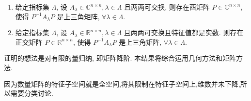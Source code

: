 \documentclass[../../main.tex]{subfiles}%
\begin{document}
\begin{proposition}\label{proposition:一族两两可交换的复数(实数)域上的矩阵可同时酉(正交)上三角化}
\begin{enumerate}
\item 给定指标集 $\Lambda$, 设 $A_{\lambda} \in \mathbb{C}^{n \times n}, \lambda \in \Lambda$ 且两两可交换, 则存在酉矩阵 $P \in \mathbb{C}^{n \times n}$, 使得
\(
P^{-1}A_{\lambda}P
\)
是上三角矩阵, $\forall \lambda \in \Lambda$.

\item 给定指标集 $\Lambda$, 设 $A_{\lambda} \in \mathbb{R}^{n \times n}, \lambda \in \Lambda$ 且两两可交换且特征值都是实数. 则存在正交矩阵 $P \in \mathbb{R}^{n \times n}$, 使得
\(
P^{-1}A_{\lambda}P
\)
是上三角矩阵, $\forall \lambda \in \Lambda$.
\end{enumerate} 
\end{proposition}
\begin{note}
证明的想法是对有限的量归纳, 即矩阵降阶. 本结果将综合运用几何方法和矩阵方法.
\end{note}
\begin{remark}
因为数量矩阵的特征子空间就是全空间,将其限制在特征子空间上,维数并未下降,所以需要分类讨论.
\end{remark}
\end{document}
